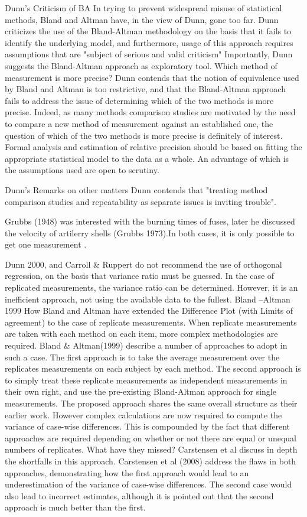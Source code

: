 Dunn’s Criticism of BA
In trying to prevent widespread misuse of statistical methods, Bland and Altman have, in the view of Dunn, gone too far.
Dunn criticizes the use of the Bland-Altman methodology on the basis that it fails to identify the underlying model, and furthermore, usage of this approach requires assumptions that are "subject of serious and valid criticism"
Importantly, Dunn suggests the Bland-Altman approach as exploratory tool.
Which method of measurement is more precise?
Dunn contends that the notion of equivalence used by Bland and Altman is too restrictive, and that the Bland-Altman approach fails to address the issue of determining which of the two methods is more precise. Indeed, as many methods comparison studies are motivated by the need to compare a new method of measurement against an established one, the question of which of the two methods is more precise is definitely of interest.
Formal analysis and estimation of relative precision should be based on fitting the appropriate statistical model to the data as a whole. An advantage of which is the assumptions used are open to scrutiny.


Dunn’s Remarks on other matters	
Dunn contends that "treating method comparison studies and repeatability as separate issues is inviting trouble".

Grubbs (1948) was interested with the burning times of fuses,  later he discussed the velocity of artilerry shells (Grubbs 1973).In both cases, it is only possible to get one measurement .

Dunn 2000, and Carroll & Ruppert do not recommend the use of orthogonal regression, on the basis that variance ratio must be guessed.  In the case of replicated measurements, the variance ratio can be determined. However, it is an inefficient approach, not using the available data to the fullest.
Bland –Altman 1999
How Bland and Altman have extended the Difference Plot (with Limits of agreement) to the case of replicate measurements.
When replicate measurements are taken with each method on each item, more complex methodologies are required. Bland & Altman(1999) describe a number of approaches to adopt in such a case. The first approach is to take the average measurement over the replicates measurements on each subject by each method.
The second approach is to simply treat these replicate measurements as independent measurements in their own right, and use the pre-existing Bland-Altman approach for single measurements.
The proposed approach shares the same overall structure as their earlier work. However complex calculations are now required to compute the variance of case-wise differences. This is compounded by the fact that different approaches are required depending on whether or not there are equal or unequal numbers of replicates.
What have they missed? Carstensen et al discuss in depth the shortfalls in this approach.
Carstensen et al (2008) address the flaws in both approaches, demonstrating how the first approach would lead to an underestimation of the variance of case-wise differences. The second case would also lead to incorrect estimates, although it is pointed out that the second approach is much better than the first.

